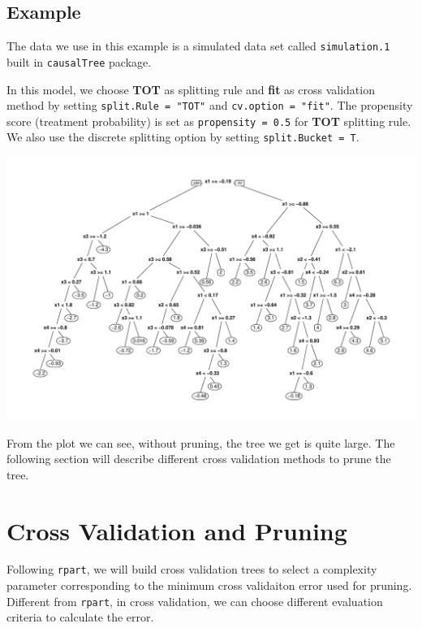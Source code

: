 \documentclass[11pt]{article}
\renewenvironment{Schunk}{\vspace{\topsep}}{\vspace{\topsep}}
\begin{document}
\subsection{Example}
The data we use in this example is a simulated data set called \texttt{simulation.1} built in \texttt{causalTree} package. \par
In this model, we choose \textbf{TOT} as splitting rule and \textbf{fit} as cross validation method by setting \texttt{split.Rule = "TOT"} and \texttt{cv.option = "fit"}. The propensity score (treatment probability) is set as \texttt{propensity = 0.5} for \textbf{TOT} splitting rule. We also use the discrete splitting option by setting \texttt{split.Bucket = T}.
\begin{Schunk}
\end{Schunk}
\includegraphics{briefintro-example1}

From the plot we can see, without pruning, the tree we get is quite large. The following section will describe different cross validation methods to prune the tree.

\section{Cross Validation and Pruning}
Following \texttt{rpart}, we will build cross validation trees to select a complexity parameter corresponding to the minimum cross validaiton error used for pruning. Different from \texttt{rpart}, in cross validation, we can choose different evaluation criteria to calculate the error.
\end{document}

